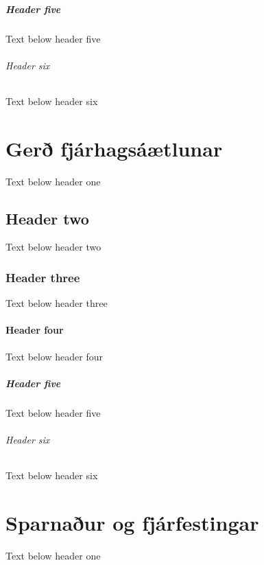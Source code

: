 \documentclass[a4paper,10pt,icelandic]{sphinxmanual}
\begin{document}
\paragraph{Header five}
\label{\detokenize{tekjur-og-utgjold/index:header-five}}
\sphinxAtStartPar
Text below header five


\subparagraph{Header six}
\label{\detokenize{tekjur-og-utgjold/index:header-six}}
\sphinxAtStartPar
Text below header six

\sphinxstepscope


\chapter{Gerð fjárhagsáætlunar}
\label{\detokenize{gerd-fjarhagsaaetlunar/index:ger-fjarhagsaaetlunar}}\label{\detokenize{gerd-fjarhagsaaetlunar/index::doc}}
\sphinxAtStartPar
Text below header one


\section{Header two}
\label{\detokenize{gerd-fjarhagsaaetlunar/index:header-two}}
\sphinxAtStartPar
Text below header two


\subsection{Header three}
\label{\detokenize{gerd-fjarhagsaaetlunar/index:header-three}}
\sphinxAtStartPar
Text below header three


\subsubsection{Header four}
\label{\detokenize{gerd-fjarhagsaaetlunar/index:header-four}}
\sphinxAtStartPar
Text below header four


\paragraph{Header five}
\label{\detokenize{gerd-fjarhagsaaetlunar/index:header-five}}
\sphinxAtStartPar
Text below header five


\subparagraph{Header six}
\label{\detokenize{gerd-fjarhagsaaetlunar/index:header-six}}
\sphinxAtStartPar
Text below header six

\sphinxstepscope


\chapter{Sparnaður og fjárfestingar}
\label{\detokenize{sparnadur-og-fjarfestingar/index:sparnaur-og-fjarfestingar}}\label{\detokenize{sparnadur-og-fjarfestingar/index::doc}}
\sphinxAtStartPar
Text below header one
\end{document}
